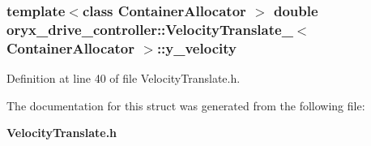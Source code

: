 \subsubsection[{y\-\_\-velocity}]{\setlength{\rightskip}{0pt plus 5cm}template$<$class Container\-Allocator $>$ double {\bf oryx\-\_\-drive\-\_\-controller\-::\-Velocity\-Translate\-\_\-}$<$ \-Container\-Allocator $>$\-::{\bf y\-\_\-velocity}}\label{structoryx__drive__controller_1_1VelocityTranslate___a59f9eed393c8e1ab07b67bd83a6ac0ed}


\-Definition at line 40 of file \-Velocity\-Translate.\-h.



\-The documentation for this struct was generated from the following file\-:\begin{DoxyCompactItemize}
\item 
{\bf \-Velocity\-Translate.\-h}\end{DoxyCompactItemize}
